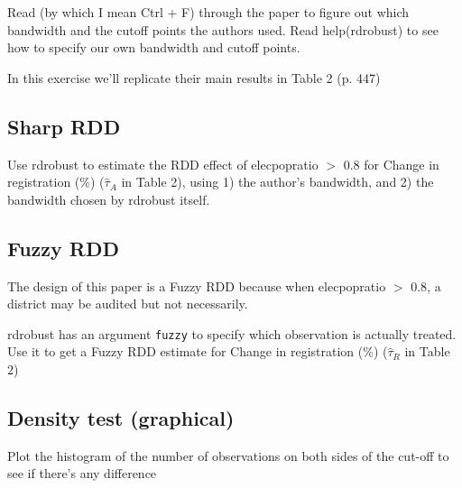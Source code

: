 \documentclass{article}\usepackage[]{graphicx}\usepackage[]{color}
\begin{document}
Read (by which I mean Ctrl + F) through the paper to figure out which bandwidth and the cutoff points the authors used. Read help(rdrobust) to see how to specify our own bandwidth and cutoff points.

In this exercise we'll replicate their main results in Table 2 (p. 447)

\subsection{Sharp RDD}

Use rdrobust to estimate the RDD effect of elecpopratio $>$ 0.8 for Change in registration (\%) ($\hat\tau_A$ in Table 2), using 1) the author's bandwidth, and 2) the bandwidth chosen by rdrobust itself.

\subsection{Fuzzy RDD}

The design of this paper is a Fuzzy RDD because when elecpopratio $>$ 0.8, a district may be audited but not necessarily.

rdrobust has an argument \verb`fuzzy` to specify which observation is actually treated. Use it to get a Fuzzy RDD estimate for Change in registration (\%) ($\hat\tau_R$ in Table 2)

\subsection{Density test (graphical)}

Plot the histogram of the number of observations on both sides of the cut-off to see if there's any difference
\end{document}
